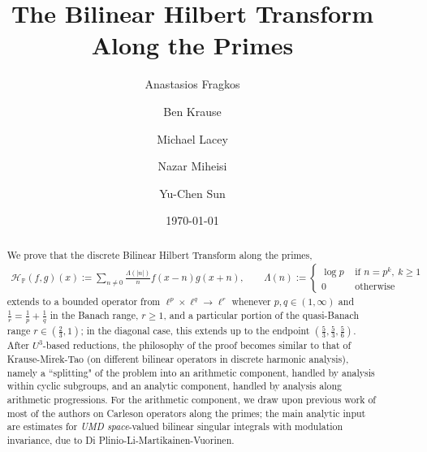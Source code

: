 \documentclass[12pt,leqno]{amsart}
\numberwithin{equation}{section}
\theoremstyle{definition}
\theoremstyle{plain}
\begin{document}
	
	\raggedbottom
	
	\title{The Bilinear Hilbert Transform Along the Primes}
	
	
	\author{Anastasios Fragkos}
	\address{
		Department of Mathematics,
		Georgia Tech \\
		686 Cherry Street, Atlanta, GA 30332-0160 USA}
	
	
	\author{Ben Krause}
	\address{
		Department of Mathematics,
		University of Bristol \\
		Beacon House, Queens Rd, Bristol BS8 1QU}
	
	\author{Michael Lacey}
	\address{
		Department of Mathematics,
		Georgia Tech \\
		686 Cherry Street, Atlanta, GA 30332-0160 USA}
	
	\author{Nazar Miheisi}
	\address{
		Department of Mathematics,
		King's College London \\
		Strand Building, Strand Campus, Strand, London, WC2R 2LS}
	
	
	
	\author{Yu-Chen Sun}
	\address{
		Department of Mathematics,
		University of Bristol \\
		Beacon House, Queens Rd, Bristol BS8 1QU}
	
	\date{\today}
	
	\begin{abstract}
		We prove that the discrete Bilinear Hilbert Transform along the primes,
		\begin{align}
			\mathcal{H}_{\mathbb{P}}(f,g)(x) := \sum_{n \neq 0} \frac{\Lambda(|n|)}{n} f(x-n) g(x+n), \qquad \Lambda(n) := \begin{cases} \log p & \text{ if } n = p^k, \ k \geq 1 \\
				0 & \text{ otherwise} \end{cases}
		\end{align}
		extends to a bounded operator from $\ell^p \times \ell^q \to \ell^r$ whenever $p,q \in (1,\infty)$ and $\frac{1}{r}=\frac{1}{p}+\frac{1}{q}$ in the Banach range, $r \geq 1$, and a particular portion of the quasi-Banach range $r \in \left(\frac{2}{3},1\right)$; in the diagonal case, this extends up to the endpoint $(\frac{5}{3},\frac{5}{3},\frac{5}{6})$.  After $U^3$-based reductions, the philosophy of the proof becomes similar to that of Krause-Mirek-Tao (on different bilinear operators in discrete harmonic analysis), namely a ``splitting" of the problem into an arithmetic component, handled by analysis within cyclic subgroups, and an analytic component, handled by analysis along arithmetic progressions. For the arithmetic component, we draw upon previous work of most of the authors on Carleson operators along the primes; the main analytic input are estimates for \emph{UMD space}-valued bilinear singular integrals with modulation invariance, due to Di Plinio-Li-Martikainen-Vuorinen.
	\end{abstract}
	
\end{document}

